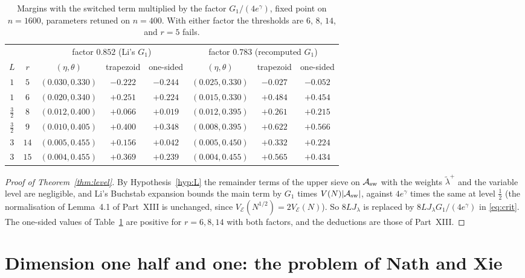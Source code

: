 \documentclass[11pt]{amsart}
\theoremstyle{remark}
\newcommand{\cA}{\mathcal A}
\newcommand{\cE}{\mathcal E}
\begin{document}
\begin{table}[htbp]
\centering\small
\begin{tabular}{cc|ccc|ccc}
\toprule
& & \multicolumn{3}{c|}{factor $0.852$ (Li's $G_1$)} & \multicolumn{3}{c}{factor $0.783$ (recomputed $G_1$)}\\
$L$ & $r$ & $(\eta,\theta)$ & trapezoid & one-sided & $(\eta,\theta)$ & trapezoid & one-sided\\
\midrule
$1$ & $5$ & $(0.030,0.330)$ & $-0.222$ & $-0.244$ & $(0.025,0.330)$ & $-0.027$ & $-0.052$\\
$1$ & $6$ & $(0.020,0.340)$ & $+0.251$ & $+0.224$ & $(0.015,0.330)$ & $+0.484$ & $+0.454$\\
$\frac32$ & $8$ & $(0.012,0.400)$ & $+0.066$ & $+0.019$ & $(0.012,0.395)$ & $+0.261$ & $+0.215$\\
$\frac32$ & $9$ & $(0.010,0.405)$ & $+0.400$ & $+0.348$ & $(0.008,0.395)$ & $+0.622$ & $+0.566$\\
$3$ & $14$ & $(0.005,0.455)$ & $+0.156$ & $+0.042$ & $(0.005,0.450)$ & $+0.332$ & $+0.224$\\
$3$ & $15$ & $(0.004,0.455)$ & $+0.369$ & $+0.239$ & $(0.004,0.455)$ & $+0.565$ & $+0.434$\\
\bottomrule
\end{tabular}
\caption{Margins with the switched term multiplied by the factor $G_1/(4e^\gamma)$, fixed point on $n=1600$, parameters retuned on $n=400$. With either factor the thresholds are $6$, $8$, $14$, and $r=5$ fails.}
\label{tab:level}
\end{table}

\begin{proof}[Proof of Theorem~\ref{thm:level}]
By Hypothesis~\ref{hyp:L} the remainder terms of the upper sieve on $\cA_{\rm sw}$ with the weights $\tilde\lambda^+$ and the variable level are negligible, and Li's Buchstab expansion bounds the main term by $G_1$ times $V(N)|\cA_{\rm sw}|$, against $4e^\gamma$ times the same at level $\frac12$ (the normalisation of Lemma~4.1 of Part~XIII is unchanged, since $V_{\cE}(N^{1/2})=2V_{\cE}(N)$). So $8LJ_\lambda$ is replaced by $8LJ_\lambda G_1/(4e^\gamma)$ in \eqref{eq:crit}. The one-sided values of Table~\ref{tab:level} are positive for $r=6,8,14$ with both factors, and the deductions are those of Part~XIII.
\end{proof}

\section{Dimension one half and one: the problem of Nath and Xie}\label{sec:nx}
\end{document}

